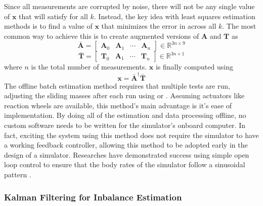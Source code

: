 Since all measurements are corrupted by noise, there will not be any single value of $\bm{x}$ that will satisfy  for all $k$. Instead, the key idea with least squares estimation methods is to find a value of $\bm{x}$ that minimizes the error in  across all $k$. The most common way to achieve this is to create augmented versions of $\bm{A}$ and $\bm{T}$ as
\begin{equation}
    \bar{\bm{A}}=\begin{bmatrix}
        \bm{A}_0 & \bm{A}_1 & \cdots & \bm{A}_n
    \end{bmatrix}\in \mathbb{R}^{3n \times 9}
\end{equation}
\begin{equation}
    \bar{\bm{T}}=\begin{bmatrix}
        \bm{T}_0 & \bm{A}_1 & \cdots & \bm{T}_n
    \end{bmatrix}\in \mathbb{R}^{3n \times 1}
\end{equation}
where $n$ is the total number of measurements. $\bm{x}$ is finally computed using 
\begin{equation}
    \bm{x}=\bar{\bm{A}}^{\dagger}\bar{\bm{T}}
\end{equation}
The offline batch estimation method requires that multiple tests are run, adjusting the sliding masses after each run using  or . Assuming actuators like reaction wheels are available, this method's main advantage is it's ease of implementation. By doing all of the estimation and data processing offline, no custom software needs to be written for the simulator's onboard computer. In fact, exciting the system using this method does not require the simulator to have a working feedback controller, allowing this method to be adopted early in the design of a simulator. Researches have demonstrated success using simple open loop control to ensure that the body rates of the simulator follow a sinusoidal pattern \cite{kim_automatic_2009} \cite{dam_applied_2014} \cite{noauthor_designing_2003}.

\subsubsection{Kalman Filtering for Inbalance Estimation}\label{sec:UKF}

